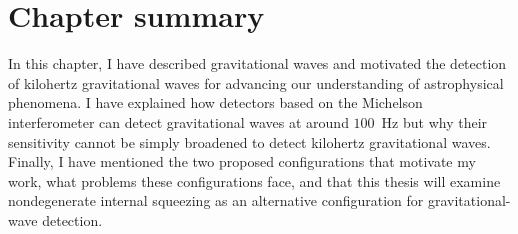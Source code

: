 

\section{Chapter summary}


In this chapter, I have described gravitational waves and motivated the detection of kilohertz gravitational waves for advancing our understanding of astrophysical phenomena. I have explained how detectors based on the Michelson interferometer can detect gravitational waves at around $100$~Hz but why their sensitivity cannot be simply broadened to detect kilohertz gravitational waves. Finally, I have mentioned the two proposed configurations that motivate my work, what problems these configurations face, and that this thesis will examine nondegenerate internal squeezing as an alternative configuration for gravitational-wave detection.



